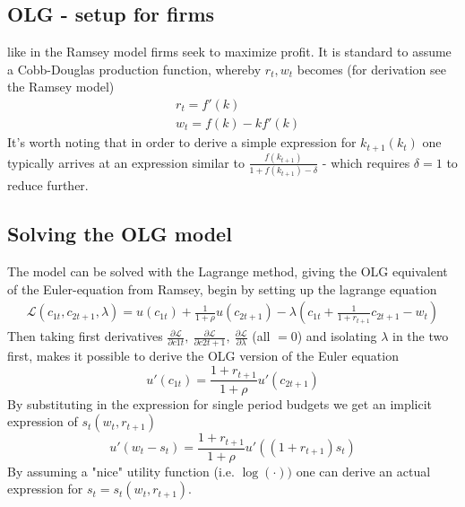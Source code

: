 \documentclass[12pt, a4paper]{article}
\begin{document}
\begin{spacing}{1.213}
\subsection{OLG - setup for firms}
like in the Ramsey model firms seek to maximize profit. It is standard to assume a Cobb-Douglas production function, whereby $r_t,w_t$ becomes (for derivation see the Ramsey model)
\begin{align*}
&r_t = f'(k) \\
&w_t = f(k) - kf'(k)
\end{align*}
It's worth noting that in order to derive a simple expression for $k_{t+1}(k_t)$ one typically arrives at an expression similar to $\frac{f(k_{t+1})}{1+f(k_{t+1})- \delta}$ - which requires $\delta =1$ to reduce further.
\subsection{Solving the OLG model}
The model can be solved with the Lagrange method, giving the OLG equivalent of the Euler-equation from Ramsey, begin by setting up the lagrange equation
\begin{align*}
\mathcal{L}(c_{1t},c_{2t+1},\lambda) =  u(c_{1t}) + \frac{1}{1+ \rho} u(c_{2t+1}) - \lambda(c_{1t} + \frac{1}{1+ r_{t+1}} c_{2t+1} - w_t)
\end{align*}
Then taking first derivatives $\frac{\partial \mathcal{L}}{\partial c{1t}}, \ \frac{\partial \mathcal{L}}{\partial c{2t+1}}, \ \frac{\partial \mathcal{L}}{\partial \lambda}$ (all $=0$) and isolating $\lambda$ in the two first, makes it possible to derive the OLG version of the Euler equation
\begin{equation}
u'(c_{1t}) = \frac{1 + r_{t+1}}{1+ \rho}u'( c_{2t+1})
\end{equation}
By substituting in the expression for single period budgets we get an implicit expression of $s_t(w_t, r_{t+1})$
\begin{equation}
u'(w_t - s_t) = \frac{1 + r_{t+1}}{1+ \rho}u'( (1+r_{t+1})s_t)
\end{equation}
By assuming a "nice" utility function (i.e. $\log(\cdot))$ one can derive an actual expression for $s_t=s_t(w_t, r_{t+1})$.


\end{spacing}
\end{document}
